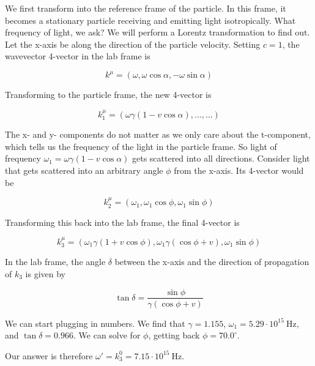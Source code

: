 

\begin{solution}

We first transform into the reference frame of the particle. In this frame, it becomes a stationary particle receiving and emitting light isotropically. What frequency of light, we ask? We will perform a Lorentz transformation to find out. Let the x-axis be along the direction of the particle velocity. Setting $c=1$, the wavevector 4-vector in the lab frame is 

$$k^{\mu}=(\omega, \omega  \cos \alpha, -\omega \sin \alpha ) $$

Transforming to the particle frame, the new 4-vector is 

$$k_1^{\mu}=(\omega \gamma (1-v\cos\alpha), ..., ...)$$

The x- and y- components do not matter as we only care about the t-component, which tells us the frequency of the light in the particle frame. So light of frequency $\omega_1=\omega \gamma (1-v\cos\alpha)$ gets scattered into all directions. Consider light that gets scattered into an arbitrary angle $\phi$ from the x-axis. Its 4-vector would be

$$k_2^{\mu}=(\omega_1, \omega_1 \cos \phi, \omega_1 \sin \phi)$$

Transforming this back into the lab frame, the final 4-vector is 

$$k_3^{\mu}=(\omega_1 \gamma (1+v\cos\phi), \omega_1 \gamma (\cos\phi+v), \omega_1 \sin \phi)$$

In the lab frame, the angle $\delta$ between the x-axis and the direction of propagation of $k_3$ is given by

$$\tan \delta = \frac{\sin \phi}{\gamma(\cos\phi+v)}$$

We can start plugging in numbers. We find that $\gamma=1.155$, $\omega_1=5.29\cdot 10^{15} \ \mathrm{Hz}$, and $\tan \delta=0.966$. We can solve for $\phi$, getting back $\phi=70.0^{\circ}$. 

Our answer is therefore $\boxed{\omega'=k_3^0=7.15\cdot 10^{15} \ \mathrm{Hz}}$.

\end{solution}

